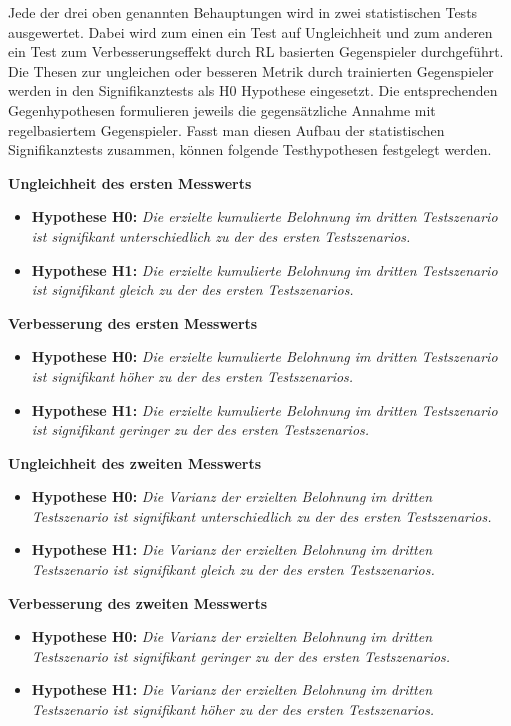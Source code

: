Jede der drei oben genannten Behauptungen wird in zwei statistischen Tests ausgewertet.
Dabei wird zum einen ein Test auf Ungleichheit und zum anderen ein Test zum Verbesserungseffekt durch RL basierten Gegenspieler durchgeführt.
Die Thesen zur ungleichen oder besseren Metrik durch trainierten Gegenspieler werden in den Signifikanztests als H0 Hypothese eingesetzt.
Die entsprechenden Gegenhypothesen formulieren jeweils die gegensätzliche Annahme mit regelbasiertem Gegenspieler. 
Fasst man diesen Aufbau der statistischen Signifikanztests zusammen, können folgende Testhypothesen festgelegt werden. 

\textbf{Ungleichheit des ersten Messwerts}
\begin{itemize}
    \item \textbf{Hypothese H0:} \textit{Die erzielte kumulierte Belohnung im dritten Testszenario ist signifikant unterschiedlich zu der des ersten Testszenarios.}
    \item \textbf{Hypothese H1:} \textit{Die erzielte kumulierte Belohnung im dritten Testszenario ist signifikant gleich zu der des ersten Testszenarios.}
\end{itemize}

\textbf{Verbesserung des ersten Messwerts}
\begin{itemize}
    \item \textbf{Hypothese H0:} \textit{Die erzielte kumulierte Belohnung im dritten Testszenario ist signifikant höher zu der des ersten Testszenarios.}
    \item \textbf{Hypothese H1:} \textit{Die erzielte kumulierte Belohnung im dritten Testszenario ist signifikant geringer zu der des ersten Testszenarios.}
\end{itemize}

\textbf{Ungleichheit des zweiten Messwerts}
\begin{itemize}
    \item \textbf{Hypothese H0:} \textit{Die Varianz der erzielten Belohnung im dritten Testszenario ist signifikant unterschiedlich zu der des ersten Testszenarios.}
    \item \textbf{Hypothese H1:} \textit{Die Varianz der erzielten Belohnung im dritten Testszenario ist signifikant gleich zu der des ersten Testszenarios.}
\end{itemize}

\textbf{Verbesserung des zweiten Messwerts}
\begin{itemize}
    \item \textbf{Hypothese H0:} \textit{Die Varianz der erzielten Belohnung im dritten Testszenario ist signifikant geringer zu der des ersten Testszenarios.}
    \item \textbf{Hypothese H1:} \textit{Die Varianz der erzielten Belohnung im dritten Testszenario ist signifikant höher zu der des ersten Testszenarios.}
\end{itemize}

